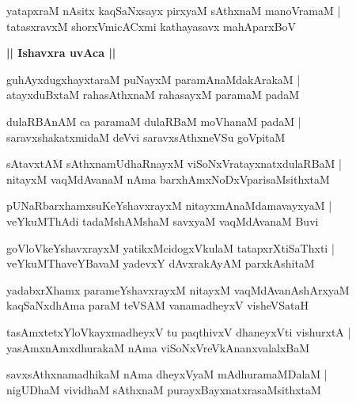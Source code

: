 \documentclass[twoside,12pt,openright]{book}
\newcounter{shloka}[chapter]
\def\uvaca#1{\centerline{{\large\textbf{#1}}}}
\begin{document}
\begin{shloka}%
yatapxraM nAsitx kaqSaNxsayx pirxyaM sAthxnaM manoVramaM |\\
tatasxravxM shorxVmicACxmi kathayasavx mahAparxBoV 
\end{shloka}

\uvaca{|| Ishavxra uvAca ||}

\begin{shloka}%
guhAyxdugxhayxtaraM puNayxM paramAnaMdakArakaM |\\
atayxduBxtaM rahasAthxnaM rahasayxM paramaM padaM 
\end{shloka}

\begin{shloka}%
dulaRBAnAM ca paramaM dulaRBaM moVhanaM padaM |\\
saravxshakatxmidaM deVvi saravxsAthxneVSu goVpitaM 
\end{shloka}

\begin{shloka}%
sAtavxtAM sAthxnamUdhaRnayxM viSoNxVratayxnatxdulaRBaM |\\
nitayxM vaqMdAvanaM nAma barxhAmxNoDxVparisaMsithxtaM 
\end{shloka}

\begin{shloka}%
pUNaRbarxhamxsuKeYshavxrayxM nitayxmAnaMdamavayxyaM |\\
veYkuMThAdi tadaMshAMshaM savxyaM vaqMdAvanaM Buvi
\end{shloka}

\begin{shloka}%
goVloVkeYshavxrayxM yatikxMcidogxVkulaM tatapxrXtiSaThxti |\\
veYkuMThaveYBavaM yadevxY dAvxrakAyAM parxkAshitaM 
\end{shloka}

\begin{shloka}%
yadabxrXhamx parameYshavxrayxM nitayxM vaqMdAvanAshArxyaM \\
kaqSaNxdhAma paraM teVSAM vanamadheyxV visheVSataH 
\end{shloka}

\begin{shloka}%
tasAmxtetxYloVkayxmadheyxV tu paqthivxV dhaneyxVti vishurxtA |\\
yasAmxnAmxdhurakaM nAma viSoNxVreVkAnanxvalalxBaM 
\end{shloka}

\begin{shloka}%
savxsAthxnamadhikaM nAma dheyxVyaM mAdhuramaMDalaM |\\
nigUDhaM vividhaM sAthxnaM purayxBayxnatxrasaMsithxtaM 
\end{shloka}
\end{document}
